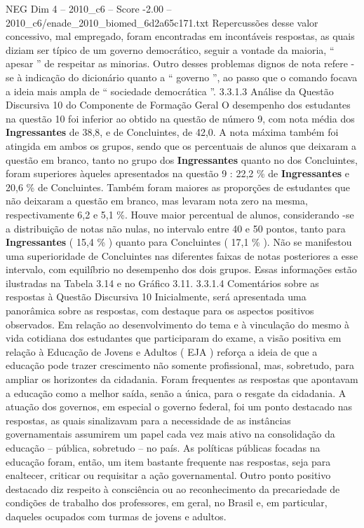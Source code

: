 \begin{textsample}{NEG Dim 4 – 2010\_c6 – Score -2.00 – 2010\_c6/enade\_2010\_biomed\_6d2a65c171.txt}
Repercussões desse valor concessivo, mal empregado, foram encontradas em incontáveis respostas, as quais diziam ser típico de um governo democrático, seguir a vontade da maioria, “ apesar ” de respeitar as minorias.
Outro desses problemas dignos de nota refere -se à indicação do dicionário quanto a “ governo ”, ao passo que o comando focava a ideia mais ampla de “ sociedade democrática ”. 3.3.1.3 Análise da Questão Discursiva 10 do Componente de Formação Geral O desempenho dos estudantes na questão 10 foi inferior ao obtido na questão de número 9, com nota média dos \textbf{Ingressantes} de 38,8, e de Concluintes, de 42,0.
A nota máxima também foi atingida em ambos os grupos, sendo que os percentuais de alunos que deixaram a questão em branco, tanto no grupo dos \textbf{Ingressantes} quanto no dos Concluintes, foram superiores àqueles apresentados na questão 9 : 22,2 \% de \textbf{Ingressantes} e 20,6 \% de Concluintes.
Também foram maiores as proporções de estudantes que não deixaram a questão em branco, mas levaram nota zero na mesma, respectivamente 6,2 e 5,1 \%.
Houve maior percentual de alunos, considerando -se a distribuição de notas não nulas, no intervalo entre 40 e 50 pontos, tanto para \textbf{Ingressantes} ( 15,4 \% ) quanto para Concluintes ( 17,1 \% ).
Não se manifestou uma superioridade de Concluintes nas diferentes faixas de notas posteriores a esse intervalo, com equilíbrio no desempenho dos dois grupos.
Essas informações estão ilustradas na Tabela 3.14 e no Gráfico 3.11. 3.3.1.4 Comentários sobre as respostas à Questão Discursiva 10 Inicialmente, será apresentada uma panorâmica sobre as respostas, com destaque para os aspectos positivos observados.
Em relação ao desenvolvimento do tema e à vinculação do mesmo à vida cotidiana dos estudantes que participaram do exame, a visão positiva em relação à Educação de Jovens e Adultos ( EJA ) reforça a ideia de que a educação pode trazer crescimento não somente profissional, mas, sobretudo, para ampliar os horizontes da cidadania.
Foram frequentes as respostas que apontavam a educação como a melhor saída, senão a única, para o resgate da cidadania.
A atuação dos governos, em especial o governo federal, foi um ponto destacado nas respostas, as quais sinalizavam para a necessidade de as instâncias governamentais assumirem um papel cada vez mais ativo na consolidação da educação – pública, sobretudo – no país.
As políticas públicas focadas na educação foram, então, um item bastante frequente nas respostas, seja para enaltecer, criticar ou requisitar a ação governamental.
Outro ponto positivo destacado diz respeito à consciência ou ao reconhecimento da precariedade de condições de trabalho dos professores, em geral, no Brasil e, em particular, daqueles ocupados com turmas de jovens e adultos.

\end{textsample}
